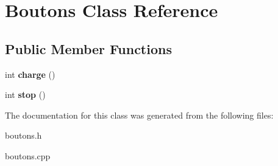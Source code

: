\hypertarget{classBoutons}{}\section{Boutons Class Reference}
\label{classBoutons}
\subsection*{Public Member Functions}
\begin{DoxyCompactItemize}
\item 
\mbox{\label{classBoutons_a6465c2eecbc7eaf980a73ea370aa9fef}} 
int {\bfseries charge} ()
\item 
\mbox{\label{classBoutons_a47f8f468799107a2c4ad98294f61f007}} 
int {\bfseries stop} ()
\end{DoxyCompactItemize}


The documentation for this class was generated from the following files\+:\begin{DoxyCompactItemize}
\item 
boutons.\+h\item 
boutons.\+cpp\end{DoxyCompactItemize}
